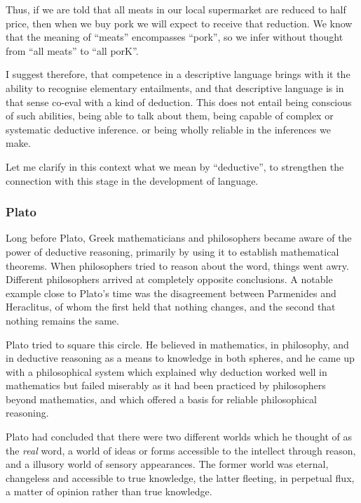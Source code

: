 \documentclass[10pt,titlepage]{article}
\begin{document}
Thus, if we are told that all meats in our local supermarket are reduced to half price, then when we buy pork we will expect to receive that reduction.
We know that the meaning of ``meats'' encompasses ``pork'', so we infer without thought from ``all meats'' to ``all porK''.

I suggest therefore, that competence in a descriptive language brings with it the ability to recognise elementary entailments, and that descriptive language is in that sense co-eval with a kind of deduction.
This does not entail being conscious of such abilities, being able to talk about them, being capable of complex or systematic deductive inference. or being wholly reliable in the inferences we make.

Let me clarify in this context what we mean by ``deductive'', to strengthen the connection with this stage in the development of language.






\subsubsection{Plato}

Long before Plato, Greek mathematicians and philosophers became aware of the power of deductive reasoning, primarily by using it to establish mathematical theorems.
When philosophers tried to reason about the word, things went awry.
Different philosophers arrived at completely opposite conclusions.
A notable example close to Plato's time was the disagreement between Parmenides and Heraclitus, of whom the first held that nothing changes, and the second that nothing remains the same.

Plato tried to square this circle.
He believed in mathematics, in philosophy, and in deductive reasoning as a means to knowledge in both spheres, and he came up with a philosophical system which explained why deduction worked well in mathematics but failed miserably as it had been practiced by philosophers beyond mathematics, and which offered a basis for reliable philosophical reasoning.

Plato had concluded that there were two different worlds which he thought of as the \emph{real} word, a world of ideas or forms accessible to the intellect through reason, and a illusory world of sensory appearances.
The former world was eternal, changeless and accessible to true knowledge, the latter fleeting, in perpetual flux, a matter of opinion rather than true knowledge.
\end{document}

